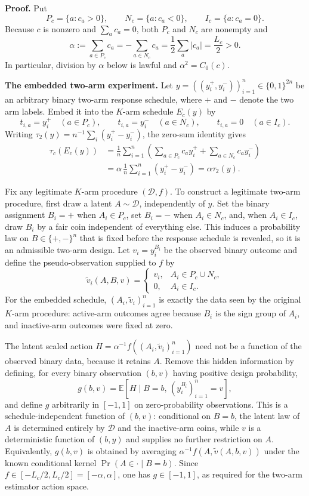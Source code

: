 \textbf{Proof.}
Put
\[
 P_c=\{a:c_a>0\},\qquad N_c=\{a:c_a<0\},\qquad I_c=\{a:c_a=0\}.
\]
Because \(c\) is nonzero and \(\sum_a c_a=0\), both \(P_c\) and \(N_c\) are nonempty and
\[
 \alpha:=\sum_{a\in P_c}c_a=-\sum_{a\in N_c}c_a
 =\frac12\sum_a|c_a|=\frac{L_c}{2}>0.
\]
In particular, division by \(\alpha\) below is lawful and \(\alpha^2=C_0(c)\).

\textbf{The embedded two-arm experiment.}
Let \(y=((y_i^+,y_i^-))_{i=1}^n\in\{0,1\}^{2n}\) be an arbitrary binary two-arm response schedule, where \(+\) and \(-\) denote the two arm labels. Embed it into the \(K\)-arm schedule \(E_c(y)\) by
\[
 t_{i,a}=y_i^+\quad(a\in P_c),\qquad
 t_{i,a}=y_i^-\quad(a\in N_c),\qquad
 t_{i,a}=0\quad(a\in I_c).
\]
Writing \(\tau_2(y)=n^{-1}\sum_i(y_i^+-y_i^-)\), the zero-sum identity gives
\[
 \begin{aligned}
 \tau_c(E_c(y))
 &=\frac1n\sum_{i=1}^n
 \left(\sum_{a\in P_c}c_a y_i^+
       +\sum_{a\in N_c}c_a y_i^-\right)\\
 &=\alpha\,\frac1n\sum_{i=1}^n(y_i^+-y_i^-)
 =\alpha\tau_2(y).
 \end{aligned}
\]

Fix any legitimate \(K\)-arm procedure \((\mathcal D,f)\). To construct a legitimate two-arm procedure, first draw a latent \(A\sim\mathcal D\), independently of \(y\). Set the binary assignment \(B_i=+\) when \(A_i\in P_c\), set \(B_i=-\) when \(A_i\in N_c\), and, when \(A_i\in I_c\), draw \(B_i\) by a fair coin independent of everything else. This induces a probability law on \(B\in\{+,-\}^n\) that is fixed before the response schedule is revealed, so it is an admissible two-arm design. Let \(v_i=y_i^{B_i}\) be the observed binary outcome and define the pseudo-observation supplied to \(f\) by
\[
 \widetilde v_i(A,B,v)=
 \begin{cases}
 v_i,&A_i\in P_c\cup N_c,\\
 0,&A_i\in I_c.
 \end{cases}
\]
For the embedded schedule, \((A_i,\widetilde v_i)_{i=1}^n\) is exactly the data seen by the original \(K\)-arm procedure: active-arm outcomes agree because \(B_i\) is the sign group of \(A_i\), and inactive-arm outcomes were fixed at zero.

The latent scaled action \(H=\alpha^{-1}f((A_i,\widetilde v_i)_{i=1}^n)\) need not be a function of the observed binary data, because it retains \(A\). Remove this hidden information by defining, for every binary observation \((b,v)\) having positive design probability,
\[
 g(b,v)=\mathbb E\!\left[H\mid B=b,\,(y_i^{B_i})_{i=1}^n=v\right],
\]
and define \(g\) arbitrarily in \([-1,1]\) on zero-probability observations. This is a schedule-independent function of \((b,v)\): conditional on \(B=b\), the latent law of \(A\) is determined entirely by \(\mathcal D\) and the inactive-arm coins, while \(v\) is a deterministic function of \((b,y)\) and supplies no further restriction on \(A\). Equivalently, \(g(b,v)\) is obtained by averaging \(\alpha^{-1}f(A,\widetilde v(A,b,v))\) under the known conditional kernel \(\Pr(A\in\cdot\mid B=b)\). Since \(f\in[-L_c/2,L_c/2]=[-\alpha,\alpha]\), one has \(g\in[-1,1]\), as required for the two-arm estimator action space.

